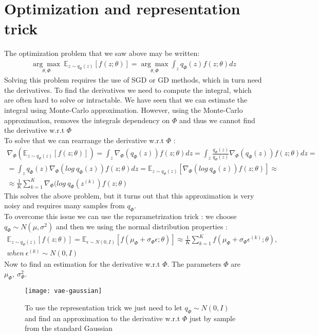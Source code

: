 \section*{Optimization and representation trick}
The optimization problem that we saw above may be written:
\begin{gather*}
\underset{\theta, \Phi}{\arg\max} \ \mathbb{E}_{z \sim q_{\Phi}(z)}[f(z;\theta)] = \underset{\theta, \Phi}{\arg\max} \int_{z} q_{\Phi}(z)f(z;\theta)dz
\end{gather*}
Solving this problem requires the use of SGD or GD methods, which in turn need the derivatives. To find the derivatives we need to compute the integral, which are often hard to solve or intractable. We have seen that we can estimate the integral using Monte-Carlo approximation. However, using the Monte-Carlo approximation, removes the integrals dependency on $\Phi$ and thus we cannot find the derivative w.r.t $\Phi$ \\
To solve that we can rearrange the derivative w.r.t $\Phi$ :
\begin{gather*}
\nabla_{\Phi} (\mathbb{E}_{z \sim q_{\Phi}(z)}[f(z;\theta)]) =  \int_{z} \nabla_{\Phi}(q_{\Phi}(z))f(z;\theta)dz = \int_{z} \frac{q_{\Phi}(z)}{q_{\Phi}(z)}\nabla_{\Phi}(q_{\Phi}(z))f(z;\theta)dz = \\
= \int_{z} q_{\Phi}(z)\nabla_{\Phi}(log \ q_{\Phi}(z))f(z;\theta)dz = \mathbb{E}_{z \sim q_{\Phi}(z)}[\nabla_{\Phi}(log \ q_{\Phi}(z))f(z;\theta)] \approx \\ \approx \frac{1}{K}\sum_{k=1}^{K}\nabla_{\Phi}(log \ q_{\Phi}(z^{(k)})f(z;\theta)
\end{gather*}
This solves the above problem, but it turns out that this approximation is very noisy and requires many samples from $q_{\Phi}$. \\
To overcome this issue we can use the reparametrization trick : we choose $q_{\Phi} \sim N(\mu, \sigma^2)$ and then we using the normal distribution properties :
\begin{gather*}
\mathbb{E}_{z \sim q_{\Phi}(z)}[f(z;\theta)] = \mathbb{E}_{\epsilon \sim N(0,I)}[f(\mu_{\Phi} + \sigma_{\Phi}\epsilon;\theta)] \approx \frac{1}{K}\sum_{k=1}^{K}f(\mu_{\Phi} + \sigma_{\Phi}\epsilon^{(k)};\theta), \\ when \ \epsilon^{(k)} \sim N(0,I)
\end{gather*} 
Now to find an estimation for the derivative w.r.t $\Phi$. The parameters $\Phi$ are $\mu_{\Phi}, \ \sigma^2_{\Phi}$.
\begin{figure}[H]
\texttt{[image: vae-gaussian]}
\caption{To use the representation trick we just need to let $q_{\Phi}\sim N(0,I)$ and find an approximation to the derivative w.r.t $\Phi$ just by sample from the standard Gaussian}
\centering
\end{figure}

